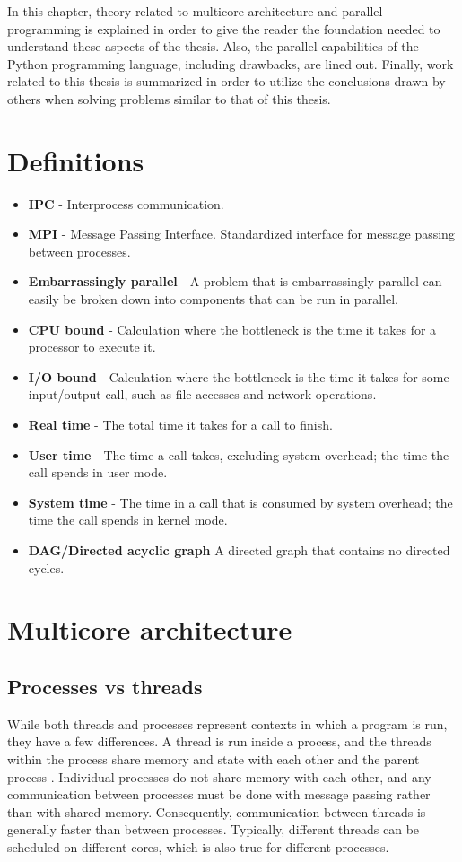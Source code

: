 In this chapter, theory related to multicore architecture and parallel programming is
explained in order to give the reader the foundation needed to understand these aspects of
the thesis. Also, the parallel capabilities of the Python programming language, including
drawbacks, are lined out. Finally, work related to this thesis is summarized in order to
utilize the conclusions drawn by others when solving problems similar to that of this thesis.

\section{Definitions}
\begin{itemize}
  \item \textbf{IPC} - Interprocess communication.
  \item \textbf{MPI} - Message Passing Interface. Standardized interface for message passing between processes.
  \item \textbf{Embarrassingly parallel} - A problem that is embarrassingly parallel can easily be broken down into components that
    can be run in parallel. %
  \item \textbf{CPU bound} - Calculation where the bottleneck is the time it takes for a processor to execute it.
  \item \textbf{I/O bound} - Calculation where the bottleneck is the time it takes for some input/output call, such as file accesses
    and network operations.
  \item \textbf{Real time} - The total time it takes for a call to finish.
  \item \textbf{User time} - The time a call takes, excluding system overhead; the time the call spends in user mode.
  \item \textbf{System time} - The time in a call that is consumed by system overhead; the time the call spends in kernel mode.
  \item \textbf{DAG/Directed acyclic graph} A directed graph that contains no directed cycles.
\end{itemize}

\section{Multicore architecture} %
\subsection{Processes vs threads}
While both threads and processes represent contexts in which a program is run, they have a few differences. A thread is run inside
a process, and the threads within the process share memory and state with each other and the parent
process \cite{singh_2013_parallel_padpwprfmm}. Individual processes do not share memory with each other, and any
communication between processes must be done with message passing rather than with shared memory. Consequently, communication
between threads is generally faster than between processes.
Typically, different threads can be scheduled on different cores, which is also true for different processes.

